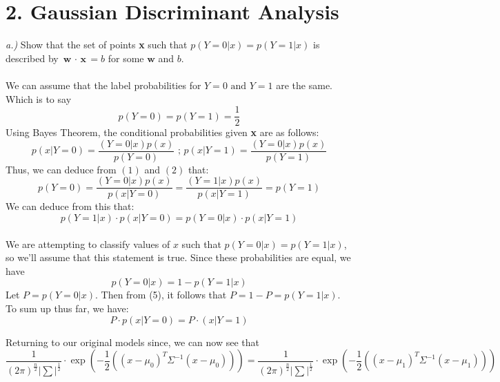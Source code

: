 \documentclass[11pt]{article}
\begin{document}
\section*{2. Gaussian Discriminant Analysis}
\noindent \textit{a.)} Show that the set of points \textbf{x} such that $p(Y = 0 | x) = p(Y = 1 | x )$ is described by $\textbf{w $\cdot$ x} = b$ for some $\textbf{w}$ and $b$.\\ \\
We can assume that the label probabilities for $Y = 0 \text{ and } Y = 1$ are the same. Which is to say
\begin{equation}p(Y = 0) = p(Y = 1) = \frac{1}{2}\end{equation}
Using Bayes Theorem, the conditional probabilities given \textbf{x} are as follows:
\begin{equation}p(x | Y = 0) = \frac{(Y = 0 | x)p(x)}{p(Y = 0)} \text{ ;   } p(x | Y = 1) = \frac{(Y = 0 | x)p(x)}{p(Y = 1)}\end{equation}
Thus, we can deduce from $(1)$ and $(2)$ that:
\begin{equation}p(Y = 0) = \frac{(Y = 0 | x)p(x)}{p(x | Y = 0)} = \frac{(Y = 1 | x)p(x)}{p(x | Y = 1)} = p(Y=1)\end{equation}
We can deduce from this that:
\begin{equation}p(Y = 1 | x) \cdot p(x | Y=0) = p(Y = 0 | x) \cdot p(x | Y=1)\end{equation}
\\
We are attempting to classify values of $x$ such that $p(Y = 0 | x) = p(Y = 1 | x)$, so we'll assume that this statement is true.
Since these probabilities are equal, we have 
\begin{equation}p(Y = 0 | x) = 1 - p(Y = 1 | x)\end{equation}
Let $P = p(Y = 0|x)$. Then from (5), it follows that $P = 1 - P = p(Y = 1 | x)$.\\
To sum up thus far, we have:
\begin{equation}P \cdot p(x | Y = 0) =  P \cdot (x | Y = 1)\end{equation}

Returning to our original models since, we can now see that
\begin{equation}
\frac{1}{(2\pi) ^ \frac{n}{2}|\sum| ^ \frac{1}{2}} \cdot \exp{(-\frac{1}{2}((x - \mu_0)^T\Sigma^{-1}(x-\mu_0)))} = \frac{1}{(2\pi) ^ \frac{n}{2}|\sum| ^ \frac{1}{2}} \cdot \exp{(-\frac{1}{2}((x - \mu_1)^T\Sigma^{-1}(x-\mu_1)))}
\end{equation}
\end{document}
